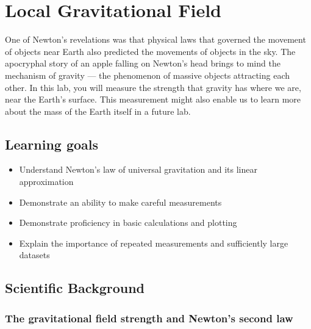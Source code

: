 \chapter{Local Gravitational Field}

One of Newton's revelations was that physical laws that governed the movement of objects near Earth also predicted the movements of objects in the sky.
The apocryphal story of an apple falling on Newton's head brings to mind the mechanism of gravity --- the phenomenon of massive objects attracting each other.
In this lab, you will measure the strength that gravity has where we are, near the Earth's surface. This measurement might also enable us to learn more about the mass of the Earth itself in a future lab.

\section{Learning goals}

\begin{itemize}
	\item Understand Newton's law of universal gravitation and its linear approximation
	
	\item Demonstrate an ability to make careful measurements
	
	\item Demonstrate proficiency in basic calculations and plotting
	
	\item Explain the importance of repeated measurements and sufficiently large datasets
\end{itemize}

\section{Scientific Background}

\subsection{The gravitational field strength and Newton's second law}

